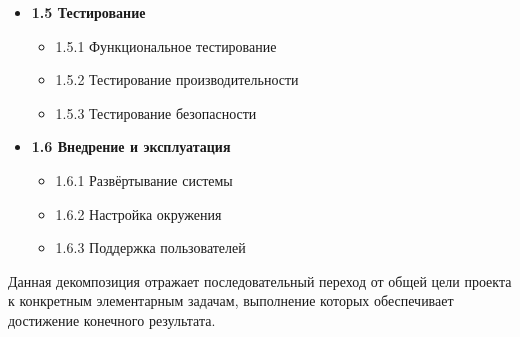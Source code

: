 \documentclass[14pt,a4paper]{extarticle}
\begin{document}
\begin{itemize}
\begin{itemize}
    \item \textbf{1.5 Тестирование}
    \begin{itemize}
        \item 1.5.1 Функциональное тестирование
        \item 1.5.2 Тестирование производительности
        \item 1.5.3 Тестирование безопасности
    \end{itemize}

    \item \textbf{1.6 Внедрение и эксплуатация}
    \begin{itemize}
        \item 1.6.1 Развёртывание системы
        \item 1.6.2 Настройка окружения
        \item 1.6.3 Поддержка пользователей
    \end{itemize}
\end{itemize}

\end{itemize}

Данная декомпозиция отражает последовательный переход от общей цели проекта к конкретным элементарным задачам, выполнение которых обеспечивает достижение конечного результата.
\end{document}
